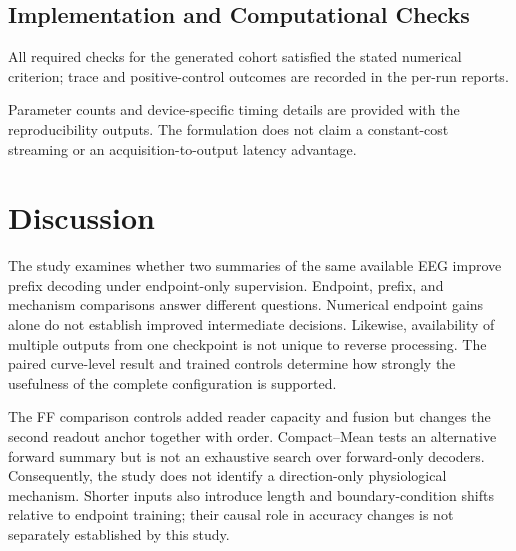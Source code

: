 \documentclass[conference]{IEEEtran}
\begin{document}
\subsection{Implementation and Computational Checks}
\begin{table}[t]
\caption{Finite causality-check maxima across the fresh cohort.
Nondegenerate refers to an in-memory randomized temporal-path copy.
These are implementation checks, not proof of raw preprocessing causality.}
\centering\small
\end{table}
All required checks for the generated cohort satisfied the stated numerical
criterion; trace and positive-control outcomes are recorded in the per-run
reports.
\begin{table}[t]
\caption{Parameter counts and measured batch-one inference time for subject 1,
seed 2025 of each dataset. Times are per-dataset device-specific medians, not
acquisition latency. Curve times use the shared-feature routine; BiTE is
measured only at its full-trial endpoint. Devices, 95th percentiles and naive
recomputation times are retained in the run records.}
\centering\scriptsize\setlength{\tabcolsep}{2pt}
\end{table}
Parameter counts and device-specific timing details are provided with the
reproducibility outputs. The formulation does not claim a constant-cost
streaming or an acquisition-to-output latency advantage.

\section{Discussion}
The study examines whether two summaries of the same available EEG improve
prefix decoding under endpoint-only supervision. Endpoint, prefix, and
mechanism comparisons answer different questions. Numerical endpoint gains
alone do not establish improved intermediate decisions. Likewise, availability
of multiple outputs from one checkpoint is not unique to reverse processing.
The paired curve-level result and trained controls determine how strongly
the usefulness of the complete configuration is supported.



The FF comparison controls added reader capacity and fusion but changes the
second readout anchor together with order. Compact--Mean tests an alternative
forward summary but is not an exhaustive search over forward-only decoders.
Consequently, the study does not identify a direction-only physiological
mechanism. Shorter inputs also introduce length and boundary-condition shifts
relative to endpoint training; their causal role in accuracy changes is not
separately established by this study.
\end{document}
